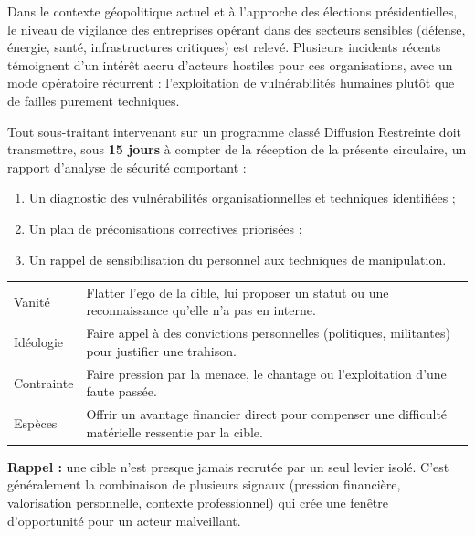 \documentclass[11pt]{article}
\begin{document}
\lhGouv
{}

Dans le contexte géopolitique actuel et à l'approche des élections présidentielles, le niveau de vigilance des entreprises opérant dans des secteurs sensibles (défense, énergie, santé, infrastructures critiques) est relevé. Plusieurs incidents récents témoignent d'un intérêt accru d'acteurs hostiles pour ces organisations, avec un mode opératoire récurrent : l'exploitation de vulnérabilités humaines plutôt que de failles purement techniques.

Tout sous-traitant intervenant sur un programme classé Diffusion Restreinte doit transmettre, sous \textbf{15 jours} à compter de la réception de la présente circulaire, un rapport d'analyse de sécurité comportant :
\begin{enumerate}[leftmargin=1.4em,itemsep=2pt,topsep=4pt]
  \item Un diagnostic des vulnérabilités organisationnelles et techniques identifiées ;
  \item Un plan de préconisations correctives priorisées ;
  \item Un rappel de sensibilisation du personnel aux techniques de manipulation.
\end{enumerate}

\begin{tabularx}{\linewidth}{@{}p{3cm}Y@{}}
 & \\[2pt]
\hline
Vanité & Flatter l'ego de la cible, lui proposer un statut ou une reconnaissance qu'elle n'a pas en interne.\\
Idéologie & Faire appel à des convictions personnelles (politiques, militantes) pour justifier une trahison.\\
Contrainte & Faire pression par la menace, le chantage ou l'exploitation d'une faute passée.\\
Espèces & Offrir un avantage financier direct pour compenser une difficulté matérielle ressentie par la cible.\\
\end{tabularx}

\vspace{10pt}
\begin{notebox}
\textbf{Rappel :} une cible n'est presque jamais recrutée par un seul levier isolé. C'est généralement la combinaison de plusieurs signaux (pression financière, valorisation personnelle, contexte professionnel) qui crée une fenêtre d'opportunité pour un acteur malveillant.
\end{notebox}
\docfooter
\end{document}

